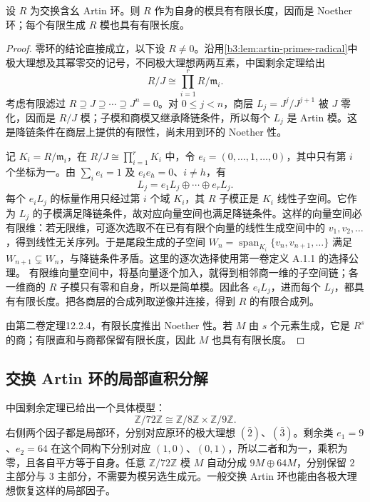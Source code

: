 \begin{theorem}\label{b3:thm:artin-finite-length}
	设 \(R\) 为交换含幺 Artin 环。则 \(R\) 作为自身的模具有有限长度，因而是 Noether 环；每个有限生成 \(R\) 模也具有有限长度。
\end{theorem}
\begin{proof}
	零环的结论直接成立，以下设 \(R\ne0\)。沿用\cref{b3:lem:artin-primes-radical}中极大理想及其幂零交的记号，不同极大理想两两互素，中国剩余定理给出
	\[
		R/J\cong\prod_{i=1}^r R/\mathfrak m_i.
	\]
	考虑有限滤过 \(R\supseteq J\supseteq\cdots\supseteq J^n=0\)。对 \(0\le j<n\)，商层 \(L_j=J^j/J^{j+1}\) 被 \(J\) 零化，因而是 \(R/J\) 模；子模和商模又继承降链条件，所以每个 \(L_j\) 是 Artin 模。这是降链条件在商层上提供的有限性，尚未用到环的 Noether 性。

	记 \(K_i=R/\mathfrak m_i\)，在 \(R/J\cong\prod_{i=1}^rK_i\) 中，令 \(e_i=(0,\ldots,1,\ldots,0)\)，其中只有第 \(i\) 个坐标为一。由 \(\sum_i e_i=1\) 及 \(e_ie_h=0\)、\(i\ne h\)，有
	\[
		L_j=e_1L_j\oplus\cdots\oplus e_rL_j.
	\]
	每个 \(e_iL_j\) 的标量作用只经过第 \(i\) 个域 \(K_i\)，其 \(R\) 子模正是 \(K_i\) 线性子空间。它作为 \(L_j\) 的子模满足降链条件，故对应向量空间也满足降链条件。这样的向量空间必有限维：若无限维，可逐次选取不在已有有限个向量的线性生成空间中的 \(v_1,v_2,\ldots\)，得到线性无关序列。于是尾段生成的子空间 \(W_n=\operatorname{span}_{K_i}\{v_n,v_{n+1},\ldots\}\) 满足 \(W_{n+1}\subsetneq W_n\)，与降链条件矛盾。这里的逐次选择使用第一卷定义 A.1.1 的选择公理。 有限维向量空间中，将基向量逐个加入，就得到相邻商一维的子空间链；各一维商的 \(R\) 子模只有零和自身，所以是简单模。因此各 \(e_iL_j\)，进而每个 \(L_j\)，都具有有限长度。把各商层的合成列取逆像并连接，得到 \(R\) 的有限合成列。

	由第二卷定理12.2.4，有限长度推出 Noether 性。若 \(M\) 由 \(s\) 个元素生成，它是 \(R^s\) 的商；有限直和与商都保留有限长度，因此 \(M\) 也具有有限长度。
\end{proof}

\subsection{交换 Artin 环的局部直积分解}
\label{b3:subsec:0303:02}

中国剩余定理已给出一个具体模型：
\[
	\mathbb Z/72\mathbb Z\cong\mathbb Z/8\mathbb Z\times\mathbb Z/9\mathbb Z.
\]
右侧两个因子都是局部环，分别对应原环的极大理想 \((\bar2)\)、\((\bar3)\)。剩余类 \(e_1=9\)、\(e_2=64\) 在这个同构下分别对应 \((1,0)\)、\((0,1)\)，所以二者和为一，乘积为零，且各自平方等于自身。任意 \(\mathbb Z/72\mathbb Z\) 模 \(M\) 自动分成 \(9M\oplus64M\)，分别保留 \(2\) 主部分与 \(3\) 主部分，不需要为模另选生成元。一般交换 Artin 环也能由各极大理想恢复这样的局部因子。

